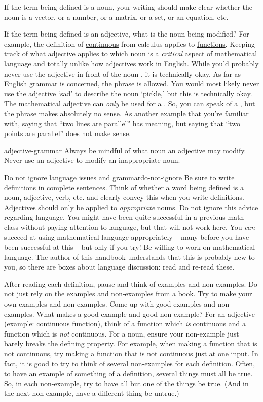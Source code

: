 \documentclass{book}
\theoremstyle{ekimcustom}
\begin{document}
If the term being defined is a noun, your writing should make clear whether the noun is a vector, or a number, or a matrix, or a set, or an equation, etc.

If the term being defined is an adjective, what is the noun being modified? For example, the definition of \underline{continuous} from calculus applies to \underline{functions}. Keeping track of what adjective applies to which noun is a \emph{critical} aspect of mathematical language and totally unlike how adjectives work in English. While you'd probably never use the adjective  in front of the noun , it is technically okay. As far as English grammar is concerned, the phrase  is allowed. 
You would most likely never use the adjective `sad' to describe the noun `pickle,' but this is technically okay.
The mathematical adjective  can \emph{only} be used for a . So, you can speak of a , but the phrase  makes absolutely no sense. As another example that you're familiar with, saying that ``two lines are parallel'' has meaning, but saying that ``two points are parallel'' does not make sense.
\begin{bwarning}{}{adjective-grammar}
Always be mindful of what noun an adjective may modify. Never use an adjective to modify an inappropriate noun.
\end{bwarning}
\begin{bwarning}{Do not ignore language issues and grammar}{do-not-ignore}
Be sure to write definitions in complete sentences. Think of whether a word being defined is a noun, adjective, verb, etc. and clearly convey this when you write definitions. Adjectives should only be applied to \emph{appropriate} nouns. Do not ignore this advice regarding language. You might have been quite successful in a previous math class without paying attention to language, but that will not work here.
\vskip6pt
You \emph{can} succeed at using mathematical language appropriately -- many before you have been successful at this -- but only if you try! Be willing to work on mathematical language. The author of this handbook understands that this is probably new to you, so there are boxes about language discussion: read and re-read these.
\end{bwarning}
After reading each definition, pause and think of examples and non-examples. Do not just rely on the examples and non-examples from a book. Try to make your own examples and non-examples. Come up with good examples and non-examples. What makes a good example and good non-example? For an adjective (example: continuous function), think of a function which \emph{is} continuous and a function which is \emph{not} continuous. For a noun, ensure your non-example just barely breaks the defining property. For example, when making a function that is not continuous, try making a function that is not continuous just at one input. In fact, it is good to try to think of several non-examples for each definition. Often, to have an example of something of a definition, several things must all be true. So, in each non-example, try to have all but one of the things be true. (And in the next non-example, have a different thing be untrue.)
\end{document}
